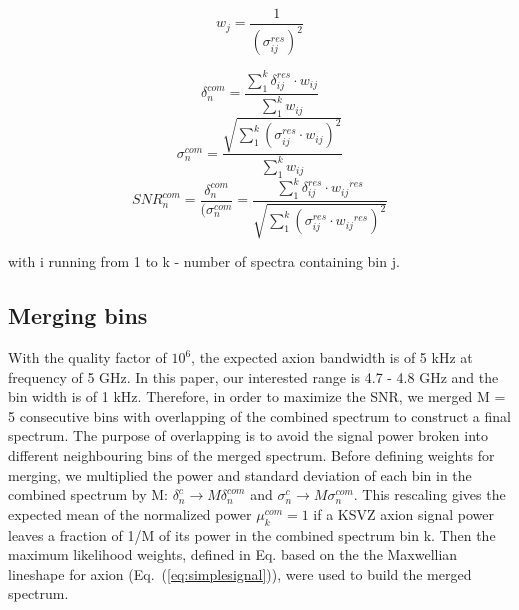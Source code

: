 \begin{equation}
    \label{eq:weight}
    {w_{j}} = \frac{1}{(\sigma_{ij}^{res})^{2}}
\end{equation}


\begin{equation}
    \label{eq:weighted_power}
    \delta_{n}^{com} = \frac{ \sum_{1}^{k}\delta_{ij}^{res} \cdot {w_{ij}}}{\sum_{1}^{k} {w_{ij}}}
\end{equation}
\begin{equation}
    \label{eq:weighted_sigma}
    \sigma_{n}^{com} = \frac{ \sqrt{\sum_{1}^{k}(\sigma_{ij}^{res} \cdot {w_{ij}})^2}}{\sum_{1}^{k} {w_{ij}}}
\end{equation}
\begin{equation}
    \label{eq:weighted_SNR}
    {SNR}_{n}^{com} = \frac{\delta^{com}_{n}}{(\sigma^{com}_{n}}= \frac{\sum_{1}^{k}\delta_{ij}^{res} \cdot {w_{ij}}^{res}}{ \sqrt{\sum_{1}^{k}(\sigma_{ij}^{res} \cdot {w_{ij}}^{res})^2}}
\end{equation}

with i running from 1 to k - number of spectra containing bin j.


\subsection{Merging bins}

With the quality factor of $10^6$, the expected axion bandwidth is of 5 kHz at frequency of 5 GHz. In this paper, our interested range is 4.7 - 4.8 GHz and the bin width is of 1 kHz. Therefore, in order to maximize the SNR, we merged M = 5 consecutive bins with overlapping of the combined spectrum to construct a final spectrum.
The purpose of overlapping is to avoid the signal power broken into different neighbouring bins of the merged spectrum. Before defining weights for merging, we multiplied the power and standard deviation of each bin in the combined spectrum by M: $\delta^{c}_n \rightarrow M\delta^{com}_n$ and $\sigma^{c}_n \rightarrow M \sigma^{com}_n$. This rescaling gives the expected mean of the normalized power $\mu^{com}_k = 1$ if a KSVZ axion signal power leaves a fraction of 1/M of its power in the combined spectrum bin k.
Then the maximum likelihood weights, defined in Eq. \cite{eq:merge_weight} based on the the Maxwellian lineshape for axion (Eq.~(\ref{eq:simplesignal})), were used to build the merged spectrum.

